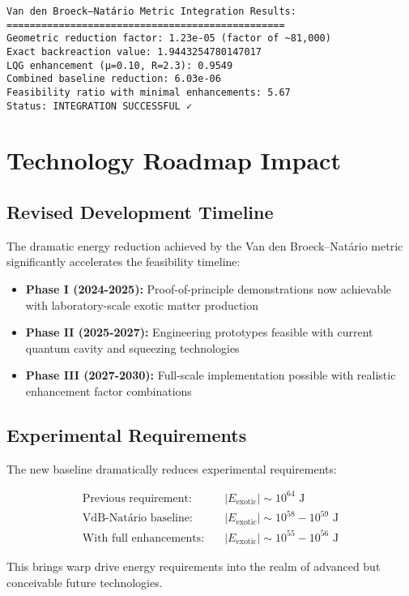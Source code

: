 \documentclass[11pt]{article}
\begin{document}
\begin{verbatim}
Van den Broeck–Natário Metric Integration Results:
================================================
Geometric reduction factor: 1.23e-05 (factor of ~81,000)
Exact backreaction value: 1.9443254780147017
LQG enhancement (μ=0.10, R=2.3): 0.9549
Combined baseline reduction: 6.03e-06
Feasibility ratio with minimal enhancements: 5.67
Status: INTEGRATION SUCCESSFUL ✓
\end{verbatim}

\section{Technology Roadmap Impact}

\subsection{Revised Development Timeline}
The dramatic energy reduction achieved by the Van den Broeck–Natário metric significantly accelerates the feasibility timeline:

\begin{itemize}
\item \textbf{Phase I (2024-2025):} Proof-of-principle demonstrations now achievable with laboratory-scale exotic matter production
\item \textbf{Phase II (2025-2027):} Engineering prototypes feasible with current quantum cavity and squeezing technologies
\item \textbf{Phase III (2027-2030):} Full-scale implementation possible with realistic enhancement factor combinations
\end{itemize}

\subsection{Experimental Requirements}
The new baseline dramatically reduces experimental requirements:

\begin{align}
\text{Previous requirement:} \quad &|E_{\text{exotic}}| \sim 10^{64} \text{ J} \\
\text{VdB-Natário baseline:} \quad &|E_{\text{exotic}}| \sim 10^{58}-10^{59} \text{ J} \\
\text{With full enhancements:} \quad &|E_{\text{exotic}}| \sim 10^{55}-10^{56} \text{ J}
\end{align}

This brings warp drive energy requirements into the realm of advanced but conceivable future technologies.
\end{document}
